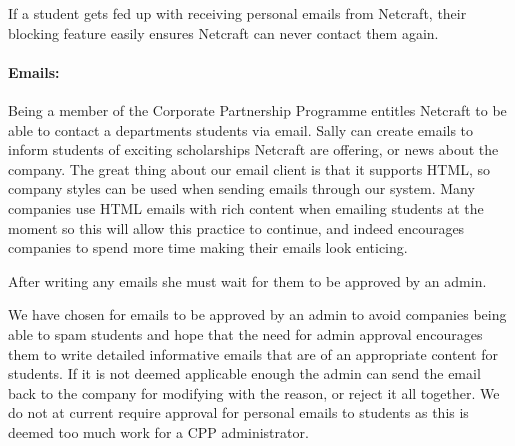     If a student gets fed up with receiving personal emails from Netcraft, their blocking feature easily ensures Netcraft can never contact them again.

  \paragraph{Emails:}
    Being a member of the Corporate Partnership Programme entitles Netcraft to be able to contact a departments students via email. Sally can create emails to inform students of exciting scholarships Netcraft are offering, or news about the company. The great thing about our email client is that it supports HTML, so company styles can be used when sending emails through our system. Many companies use HTML emails with rich content when emailing students at the moment so this will allow this practice to continue, and indeed encourages companies to spend more time making their emails look enticing.

    After writing any emails she must wait for them to be approved by an admin. 

    We have chosen for emails to be approved by an admin to avoid companies being able to spam students and hope that the need for admin approval encourages them to write detailed informative emails that are of an appropriate content for students. If it is not deemed applicable enough the admin can send the email back to the company for modifying with the reason, or reject it all together.
    We do not at current require approval for personal emails to students as this is deemed too much work for a CPP administrator.  


